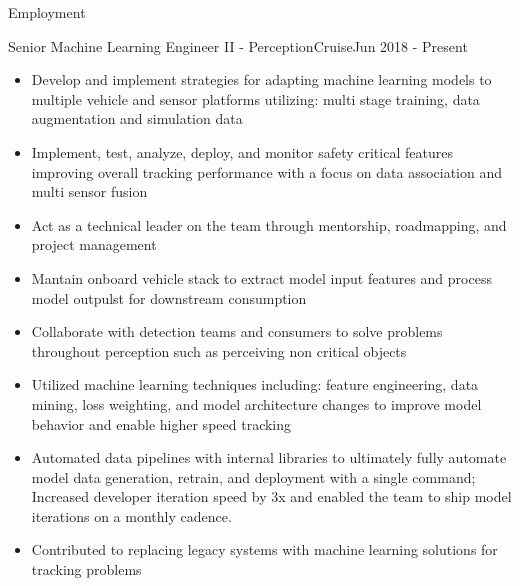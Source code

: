 \documentclass[]{mcdowellcv}
\begin{document}
\makeheader

\begin{cvsection}{Employment}

\begin{cruise}
    \begin{cvsubsection}{Senior Machine Learning Engineer II - Perception}{Cruise}{Jun 2018 - Present}
        \begin{itemize}
            \item Develop and implement strategies for adapting machine learning models to multiple vehicle and sensor platforms utilizing: multi stage training, data augmentation and simulation data 
            \item Implement, test, analyze, deploy, and monitor safety critical features improving overall tracking performance with a focus on data association and multi sensor fusion
            \item Act as a technical leader on the team through mentorship, roadmapping, and project management
            \item Mantain onboard vehicle stack to extract model input features and process model outpulst for downstream consumption 
            \item Collaborate with detection teams and consumers to solve problems throughout perception such as perceiving non critical objects
            \item Utilized machine learning techniques including: feature engineering, data mining, loss weighting, and model architecture changes to improve model behavior and enable higher speed tracking 
            \item Automated data pipelines with internal libraries to ultimately fully automate model data generation, retrain, and deployment with a single command; Increased developer iteration speed by 3x and enabled the team to ship model iterations on a monthly cadence.
            \item Contributed to replacing legacy systems with machine learning solutions for tracking problems
        \end{itemize}
    \end{cvsubsection}
\end{cruise}


\end{cvsection}
\end{document}
